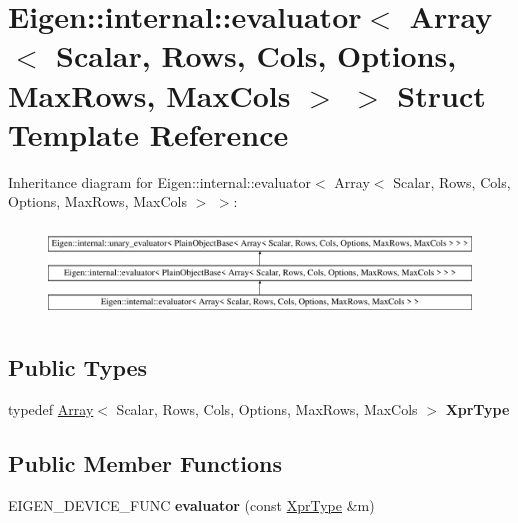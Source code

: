 \hypertarget{struct_eigen_1_1internal_1_1evaluator_3_01_array_3_01_scalar_00_01_rows_00_01_cols_00_01_options211222ab89c0f0e9e4e97c28137aec40}{}\section{Eigen\+::internal\+::evaluator$<$ Array$<$ Scalar, Rows, Cols, Options, Max\+Rows, Max\+Cols $>$ $>$ Struct Template Reference}
\label{struct_eigen_1_1internal_1_1evaluator_3_01_array_3_01_scalar_00_01_rows_00_01_cols_00_01_options211222ab89c0f0e9e4e97c28137aec40}
Inheritance diagram for Eigen\+::internal\+::evaluator$<$ Array$<$ Scalar, Rows, Cols, Options, Max\+Rows, Max\+Cols $>$ $>$\+:\begin{figure}[H]
\begin{center}
\leavevmode
\includegraphics[height=2.470588cm]{struct_eigen_1_1internal_1_1evaluator_3_01_array_3_01_scalar_00_01_rows_00_01_cols_00_01_options211222ab89c0f0e9e4e97c28137aec40}
\end{center}
\end{figure}
\subsection*{Public Types}
\begin{DoxyCompactItemize}
\item 
\mbox{\label{struct_eigen_1_1internal_1_1evaluator_3_01_array_3_01_scalar_00_01_rows_00_01_cols_00_01_options211222ab89c0f0e9e4e97c28137aec40_a8c05424c2b21ad594be7765087e95d82}} 
typedef \mbox{\hyperlink{class_eigen_1_1_array}{Array}}$<$ Scalar, Rows, Cols, Options, Max\+Rows, Max\+Cols $>$ {\bfseries Xpr\+Type}
\end{DoxyCompactItemize}
\subsection*{Public Member Functions}
\begin{DoxyCompactItemize}
\item 
\mbox{\label{struct_eigen_1_1internal_1_1evaluator_3_01_array_3_01_scalar_00_01_rows_00_01_cols_00_01_options211222ab89c0f0e9e4e97c28137aec40_a5bb6989dade9d2973cccd7b1c2041810}} 
E\+I\+G\+E\+N\+\_\+\+D\+E\+V\+I\+C\+E\+\_\+\+F\+U\+NC {\bfseries evaluator} (const \mbox{\hyperlink{class_eigen_1_1_array}{Xpr\+Type}} \&m)
\end{DoxyCompactItemize}


